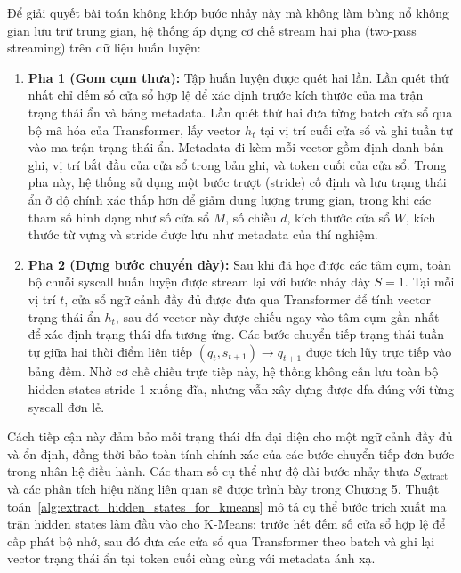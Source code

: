 \documentclass[../main.tex]{subfiles}
\begin{document}
Để giải quyết bài toán không khớp bước nhảy này mà không làm bùng nổ
không gian lưu trữ trung gian, hệ thống áp dụng cơ chế stream hai pha
(two-pass streaming) trên dữ liệu huấn luyện:
\begin{enumerate}
  \item \textbf{Pha 1 (Gom cụm thưa):} Tập huấn luyện được quét hai
    lần. Lần quét thứ nhất chỉ đếm số cửa sổ hợp lệ để xác định trước
    kích thước của ma trận trạng thái ẩn và bảng metadata. Lần quét
    thứ hai đưa từng batch cửa sổ qua bộ mã hóa của Transformer, lấy
    vector $h_t$ tại vị trí cuối cửa sổ và ghi tuần tự vào ma trận
    trạng thái ẩn. Metadata đi kèm mỗi vector gồm định danh bản ghi,
    vị trí bắt đầu của cửa sổ trong bản ghi, và token cuối của cửa
    sổ. Trong pha này, hệ thống sử dụng một bước trượt (stride) cố định và lưu
    trạng thái ẩn ở độ chính xác thấp hơn để giảm dung lượng trung
    gian, trong khi các tham số hình dạng như số cửa sổ $M$, số chiều
    $d$, kích thước cửa sổ $W$, kích thước từ vựng và stride được lưu
    như metadata của thí nghiệm.
  \item \textbf{Pha 2 (Dựng bước chuyển dày):} Sau khi đã học được
    các tâm cụm, toàn bộ chuỗi \gls{syscall} huấn luyện được stream lại với
    bước nhảy dày $S = 1$. Tại mỗi vị trí $t$, cửa sổ ngữ cảnh đầy đủ
    được đưa qua Transformer để tính vector trạng thái ẩn $h_t$, sau
    đó vector này được chiếu ngay vào tâm cụm gần nhất để xác định
    trạng thái \gls{dfa} tương ứng. Các bước chuyển tiếp trạng thái tuần tự
    giữa hai thời điểm liên tiếp $(q_t, s_{t+1}) \to q_{t+1}$ được
    tích lũy trực tiếp vào bảng đếm. Nhờ cơ chế chiếu trực tiếp này,
    hệ thống không cần lưu toàn bộ hidden states stride-1 xuống đĩa,
    nhưng vẫn xây dựng được \gls{dfa} đúng với từng \gls{syscall} đơn lẻ.
\end{enumerate}
Cách tiếp cận này đảm bảo mỗi trạng thái \gls{dfa} đại diện cho một ngữ
cảnh đầy đủ và ổn định, đồng thời bảo toàn tính chính xác của các
bước chuyển tiếp đơn bước trong nhân hệ điều hành. Các tham số cụ thể
như độ dài bước nhảy thưa $S_{\text{extract}}$ và các phân tích hiệu
năng liên quan sẽ được trình bày trong Chương 5. Thuật
toán~\ref{alg:extract_hidden_states_for_kmeans} mô tả cụ thể bước
trích xuất ma trận hidden states làm đầu vào cho K-Means: trước hết
đếm số cửa sổ hợp lệ để cấp phát bộ nhớ, sau đó đưa các cửa sổ qua
Transformer theo batch và ghi lại vector trạng thái ẩn tại token cuối
cùng cùng với metadata ánh xạ.
\end{document}
